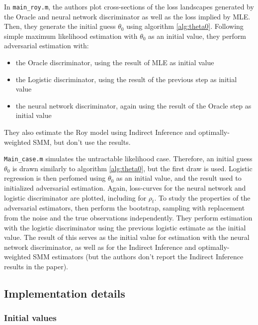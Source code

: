 In \texttt{main\_roy.m}, the authors plot cross-sections of the loss landscapes generated by the Oracle and neural network discriminator as well as the loss implied by MLE. %
Then, they generate the initial guess $\theta_0$ using algorithm \ref{alg:theta0}.
Following simple maximum likelihood estimation with $\theta_0$ as an initial value, they perform adversarial estimation with:
\begin{itemize}
    \item the Oracle discriminator, using the result of MLE as initial value
    \item the Logistic discriminator, using the result of the previous step as initial value
    \item the neural network discriminator, again using the result of the Oracle step as initial value
\end{itemize} 
They also estimate the Roy model using Indirect Inference and optimally-weighted SMM, but don't use the results.

\texttt{Main\_case.m} simulates the untractable likelihood case.
Therefore, an initial guess $\theta_0$ is drawn similarly to algorithm \ref{alg:theta0}, but the first draw is used.
Logistic regression is then perfomed using $\theta_0$ as an initial value, and the result used to initialized adversarial estimation. %
Again, loss-curves for the neural network and logistic discriminator are plotted, including for $\rho_t$.
To study the properties of the adversarial estimators, \textcite{kaji2023adversarial} then perform the bootstrap, sampling with replacement from the noise and the true observations independently.
They perform estimation with the logistic discriminator using the previous logistic estimate as the initial value. %
The result of this serves as the initial value for estimation with the neural network discriminator, as well as for the Indirect Inference and optimally-weighted SMM estimators (but the authors don't report the Indirect Inference results in the paper). %


\subsection{Implementation details}
\label{sec:Implementation}

\subsubsection{Initial values}
\label{sec:initial_values}


